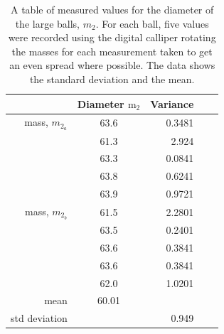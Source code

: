 \documentclass[12pt]{article}
\begin{document}
\begin{table}[H]
\centering
\begin{tabular}{| r | c | r  | c  | | r  | } 
\hline


& Diameter $\mathrm{m_{2}}$ & Variance  \\
\hline
mass, $m_{2_{a}}$ & 63.6 & 0.3481  \\
& 61.3 & 2.924 \\
& 63.3 & 0.0841 \\
& 63.8 & 0.6241 \\
& 63.9 & 0.9721 \\
\hline
mass, $m_{2_{b}}$  & 61.5 & 2.2801 \\
& 63.5 & 0.2401 \\
& 63.6 & 0.3841 \\
& 63.6 &  0.3841 \\
& 62.0 & 1.0201 \\
\hline 
mean & 60.01 &  \\
\hline
std deviation & & 0.949 \\
\hline
\end{tabular}
\caption{A table of measured values for the diameter of the large balls, $m_{2}$. For each ball, five values were recorded using the digital calliper rotating the masses for each measurement taken to get an even spread where possible. The data shows the standard deviation and the mean.}
\label{tab:table}
\end{table}%
\end{document}
